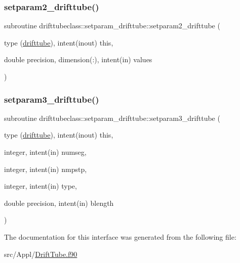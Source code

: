 \mbox{\label{interfacedrifttubeclass_1_1setparam__drifttube_ad486c914db6dae5a0b5f50849f581945}} 
\subsubsection{\texorpdfstring{setparam2\_drifttube()}{setparam2\_drifttube()}}
{\footnotesize\ttfamily subroutine drifttubeclass\+::setparam\+\_\+drifttube\+::setparam2\+\_\+drifttube (\begin{DoxyParamCaption}\item[{type (\mbox{\hyperlink{namespacedrifttubeclass_structdrifttubeclass_1_1drifttube}{drifttube}}), intent(inout)}]{this,  }\item[{double precision, dimension(\+:), intent(in)}]{values }\end{DoxyParamCaption})}

\mbox{\label{interfacedrifttubeclass_1_1setparam__drifttube_ace2b0784fb4c5e2de4ea96ef3f9a4d95}} 
\subsubsection{\texorpdfstring{setparam3\_drifttube()}{setparam3\_drifttube()}}
{\footnotesize\ttfamily subroutine drifttubeclass\+::setparam\+\_\+drifttube\+::setparam3\+\_\+drifttube (\begin{DoxyParamCaption}\item[{type (\mbox{\hyperlink{namespacedrifttubeclass_structdrifttubeclass_1_1drifttube}{drifttube}}), intent(inout)}]{this,  }\item[{integer, intent(in)}]{numseg,  }\item[{integer, intent(in)}]{nmpstp,  }\item[{integer, intent(in)}]{type,  }\item[{double precision, intent(in)}]{blength }\end{DoxyParamCaption})}



The documentation for this interface was generated from the following file\+:\begin{DoxyCompactItemize}
\item 
src/\+Appl/\mbox{\hyperlink{_drift_tube_8f90}{Drift\+Tube.\+f90}}\end{DoxyCompactItemize}
